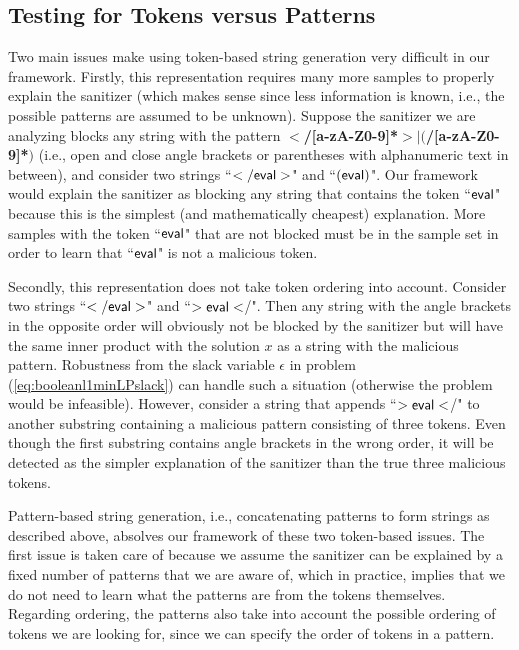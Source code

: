 \subsection{Testing for Tokens versus Patterns}
Two main issues make using token-based string generation very difficult in our framework. Firstly, this representation requires many more samples to properly explain the sanitizer (which makes sense since less information is known, i.e., the possible patterns are assumed to be unknown). Suppose the sanitizer we are analyzing blocks any string with the pattern \textbf{$<$/[a-zA-Z0-9]*$>$$|$$($/[a-zA-Z0-9]*$)$} (i.e., open and close angle brackets or parentheses with alphanumeric text in between), and consider two strings ``$\sf{</eval>}$" and ``$\sf{(eval)}$". Our framework would explain the sanitizer as blocking any string that contains the token ``$\sf{eval}$" because this is the simplest (and mathematically cheapest) explanation. More samples with the token ``$\sf{eval}$" that are not blocked must be in the sample set in order to learn that ``$\sf{eval}$" is not a malicious token.

Secondly, this representation does not take token ordering into account. Consider two strings ``$\sf{</eval>}$" and ``$\sf{>eval<}$/". Then any string with the angle brackets in the opposite order will obviously not be blocked by the sanitizer but will have the same inner product with the solution $x$ as a string with the malicious pattern. Robustness from the slack variable $\epsilon$ in problem (\ref{eq:booleanl1minLPslack}) can handle such a situation (otherwise the problem would be infeasible). However, consider a string that appends ``$\sf{>eval<}$/" to another substring containing a malicious pattern consisting of three tokens.  Even though the  first substring contains angle brackets in the wrong order, it will be detected as the simpler explanation of the sanitizer than the true three malicious tokens.

Pattern-based string generation, i.e., concatenating patterns to form strings as described above, absolves our framework of these two token-based issues. The first issue is taken care of because we assume the sanitizer can be explained by a fixed number of patterns that we are aware of, which in practice, implies that we do not need to learn what the patterns are from the tokens themselves. Regarding ordering, the patterns also take into account the possible ordering of tokens we are looking for, since we can specify the order of tokens in a pattern.

